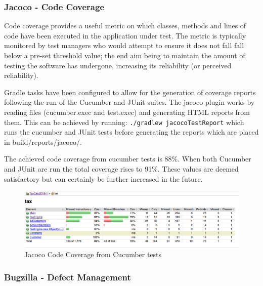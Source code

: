 \subsubsection{Jacoco - Code Coverage}
Code coverage provides a useful metric on which classes, methods and lines of code have been executed in the application under test. 
The metric is typically monitored by test managers who would attempt to ensure it does not fall fall below a pre-set threshold value; the end aim being to maintain the amount of testing the software has undergone, increasing its  reliability (or perceived reliability).  
\par
Gradle tasks have been configured to allow for the generation of coverage reports following the run of the Cucumber and JUnit suites. The jacoco plugin works by reading files (cucumber.exec and test.exec) and generating HTML reports from them. This can be achieved by running: 
\lstinline{./gradlew jacocoTestReport} which runs the cucumber and JUnit tests before generating the reports which are placed in build/reports/jacoco/. 
\par 
The achieved code coverage from cucumber tests is 88\%. 
When both Cucumber and JUnit are run the total coverage rises to 91\%. These values are deemed satisfactory but can certainly be further increased in the future.
\begin{figure}[H]
\centering
\includegraphics[scale=0.4]{res/cucumber-coverage.png}
\caption{Jacoco Code Coverage from Cucumber tests}
\end{figure}

\subsubsection{Bugzilla - Defect Management}
